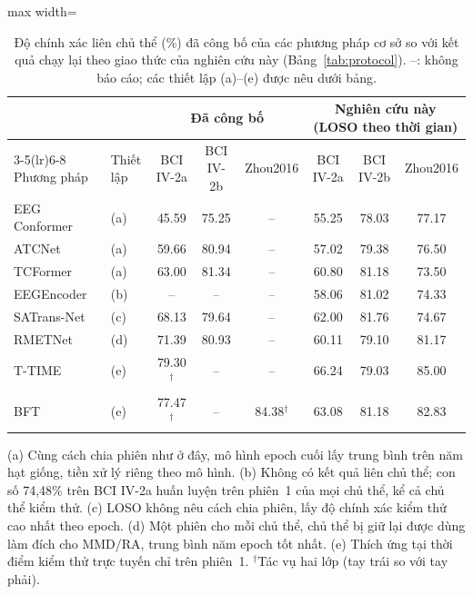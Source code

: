 \documentclass[preprint,12pt]{elsarticle}
\begin{document}
\begin{table}[!htbp]
\centering
\caption{Độ chính xác liên chủ thể (\%) đã công bố của các phương pháp cơ sở so với kết quả chạy lại theo giao thức của nghiên cứu này (Bảng~\ref{tab:protocol}). --: không báo cáo; các thiết lập (a)--(e) được nêu dưới bảng.}
\label{tab:published}
\footnotesize
\setlength{\tabcolsep}{4pt}
\begin{adjustbox}{max width=\textwidth}
\begin{tabular}{llccc@{\hspace{14pt}}ccc}
\toprule
 & & \multicolumn{3}{c}{Đã công bố} & \multicolumn{3}{c}{Nghiên cứu này (LOSO theo thời gian)} \\
\cmidrule(lr){3-5}\cmidrule(lr){6-8}
Phương pháp & Thiết lập & BCI IV-2a & BCI IV-2b & Zhou2016 & BCI IV-2a & BCI IV-2b & Zhou2016 \\
\midrule
EEG Conformer~\cite{song2023eegconformer} & (a)~\cite{altaheri2025tcformer} & 45.59 & 75.25 & -- & 55.25 & 78.03 & 77.17 \\
ATCNet~\cite{altaheri2023atcnet} & (a)~\cite{altaheri2025tcformer} & 59.66 & 80.94 & -- & 57.02 & 79.38 & 76.50 \\
TCFormer~\cite{altaheri2025tcformer} & (a) & 63.00 & 81.34 & -- & 60.80 & 81.18 & 73.50 \\
EEGEncoder~\cite{liao2025eegencoder} & (b) & -- & -- & -- & 58.06 & 81.02 & 74.33 \\
SATrans-Net~\cite{miao2025satransnet} & (c) & 68.13 & 79.64 & -- & 62.00 & 81.76 & 74.67 \\
RMETNet~\cite{zhao2026rmetnet} & (d) & 71.39 & 80.93 & -- & 60.11 & 79.10 & 81.17 \\
T-TIME~\cite{li2024ttime} & (e) & 79.30$^{\dagger}$ & -- & -- & 66.24 & 79.03 & 85.00 \\
BFT~\cite{li2026bft} & (e) & 77.47$^{\dagger}$ & -- & 84.38$^{\dagger}$ & 63.08 & 81.18 & 82.83 \\
\bottomrule
\end{tabular}
\end{adjustbox}
\par\smallskip
\begin{minipage}{\textwidth}\scriptsize
(a) Cùng cách chia phiên như ở đây, mô hình epoch cuối lấy trung bình trên năm hạt giống, tiền xử lý riêng theo mô hình. (b) Không có kết quả liên chủ thể; con số 74,48\% trên BCI IV-2a huấn luyện trên phiên~1 của mọi chủ thể, kể cả chủ thể kiểm thử. (c) LOSO không nêu cách chia phiên, lấy độ chính xác kiểm thử cao nhất theo epoch. (d) Một phiên cho mỗi chủ thể, chủ thể bị giữ lại được dùng làm đích cho MMD/RA, trung bình năm epoch tốt nhất. (e) Thích ứng tại thời điểm kiểm thử trực tuyến chỉ trên phiên~1. $^{\dagger}$Tác vụ hai lớp (tay trái so với tay phải).
\end{minipage}
\end{table}
\end{document}
